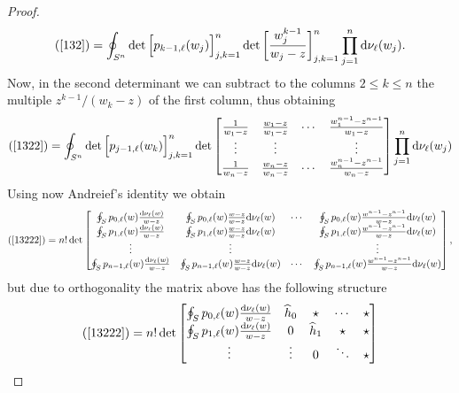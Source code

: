 \documentclass[10pt,reqno,oneside]{amsart}
\renewcommand{\d}{{\mathrm d}}
\numberwithin{equation}{section}
\def\eqref#1{(\ref{#1})}
\begin{document}
\begin{proof}
\begin{equation}\label{1322}
	\eqref{132}=\oint_{S^n} \det\Big[p_{k-1,\ell}(w_j)\Big]_{j,k=1}^n\det \bigg[\frac{w_j^{k-1}}{w_j-z} \bigg]_{j,k=1}^n\prod_{j=1}^{n} {\d\nu_{\ell}(w_j)}.
\end{equation}
Now, in the second determinant we can subtract to the columns $2\leq k\leq n$ the multiple $z^{k-1}/(w_k-z)$ of the first column, thus obtaining 
\begin{equation}\label{13222}
\eqref{1322} =  
\oint_{S^n} \det\Big[p_{j-1,\ell}(w_k)\Big]_{j,k=1}^n 
 \det\begin{bmatrix}
 \frac{1}{w_1-z} & \frac{w_1-z}{w_1-z} & \cdots & \frac{w_1^{n-1}-z^{n-1}}{w_1-z}\\
 \vdots & \vdots& &\vdots\\
 \frac{1}{w_n-z} & \frac{w_n-z}{w_n-z} & \cdots & \frac{w_n^{n-1}-z^{n-1}}{w_n-z}
 \end{bmatrix} \prod_{j=1}^n\d\nu_{\ell}(w_j)
% 
\end{equation}
Using now Andreief's identity we obtain  %
\begin{equation*}
\eqref{13222} = n! \det \begin{bmatrix}
\oint_Sp_{0,\ell}(w)\frac{\d\nu_{\ell}(w)}{w-z} & \oint_Sp_{0,\ell}(w)\frac{w-z}{w-z}\d\nu_{\ell}(w) & \cdots & \oint_Sp_{0,\ell}(w)\frac{w^{n-1}-z^{n-1}}{w-z}\d\nu_{\ell}(w)\\
\oint_Sp_{1,\ell}(w)\frac{\d\nu_{\ell}(w)}{w-z} & \oint_Sp_{1,\ell}(w)\frac{w-z}{w-z}\d\nu_{\ell}(w) & & \oint_Sp_{1,\ell}(w)\frac{w^{n-1}-z^{n-1}}{w-z}\d\nu_{\ell}(w)\\
\vdots & \vdots& & \vdots\\
\oint_Sp_{n-1,\ell}(w)\frac{\d\nu_{\ell}(w)}{w-z} &\oint_Sp_{n-1,\ell}(w)\frac{w-z}{w-z}\d\nu_{\ell}(w) & \cdots& \oint_Sp_{n-1,\ell}(w)\frac{w^{n-1}-z^{n-1}}{w-z}\d\nu_{\ell}(w)
\end{bmatrix},
%
%
\end{equation*}
but due to orthogonality the matrix above has the following structure
\begin{equation*}
\eqref{13222}= n! \det \begin{bmatrix}
\oint_Sp_{0,\ell}(w)\frac{\d\nu_{\ell}(w)}{w-z} & \widehat{h}_0 & \star & \cdots & \star\\
\oint_Sp_{1,\ell}(w)\frac{\d\nu_{\ell}(w)}{w-z} & 0 & \widehat{h}_1 & \star & \star\\
\vdots & \vdots & 0& \ddots&\star\\

\end{bmatrix}
\end{equation*}
\end{proof}
\end{document}
